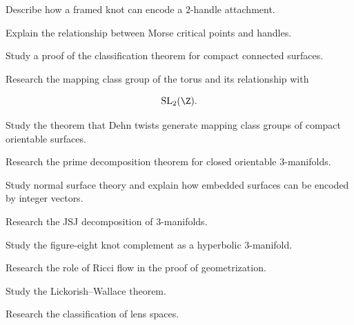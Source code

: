 \begin{exercise}[3]
Describe how a framed knot can encode a \(2\)-handle attachment.
\end{exercise}

\begin{exercise}[3]
Explain the relationship between Morse critical points and handles.
\end{exercise}

\begin{exercise}[4]
Study a proof of the classification theorem for compact connected surfaces.
\end{exercise}

\begin{exercise}[4]
Research the mapping class group of the torus and its relationship with

\[
\mathrm{SL}_2(\Z).
\]
\end{exercise}

\begin{exercise}[4]
Study the theorem that Dehn twists generate mapping class groups of compact
orientable surfaces.
\end{exercise}

\begin{exercise}[4]
Research the prime decomposition theorem for closed orientable
\(3\)-manifolds.
\end{exercise}

\begin{exercise}[4]
Study normal surface theory and explain how embedded surfaces can be encoded
by integer vectors.
\end{exercise}

\begin{exercise}[4]
Research the JSJ decomposition of \(3\)-manifolds.
\end{exercise}

\begin{exercise}[4]
Study the figure-eight knot complement as a hyperbolic \(3\)-manifold.
\end{exercise}

\begin{exercise}[4]
Research the role of Ricci flow in the proof of geometrization.
\end{exercise}

\begin{exercise}[4]
Study the Lickorish--Wallace theorem.
\end{exercise}

\begin{exercise}[4]
Research the classification of lens spaces.
\end{exercise}

